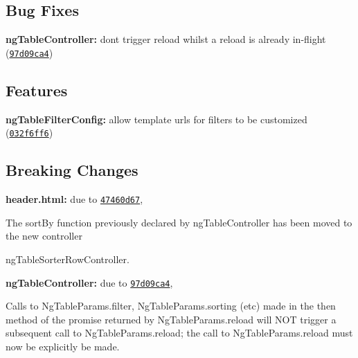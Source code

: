 \subsection*{Bug Fixes}


\begin{DoxyItemize}
\item {\bfseries ng\+Table\+Controller\+:} don\textquotesingle{}t trigger reload whilst a reload is already in-\/flight (\href{https://github.com/esvit/ng-table/commit/97d09ca43501ea97a30e1afcd04f6ed81df4f97d}{\tt 97d09ca4})
\end{DoxyItemize}

\subsection*{Features}


\begin{DoxyItemize}
\item {\bfseries ng\+Table\+Filter\+Config\+:} allow template urls for filters to be customized (\href{https://github.com/esvit/ng-table/commit/032f6ff6aec0fcad7c4d84976aee8dc317c67a6c}{\tt 032f6ff6})
\end{DoxyItemize}

\subsection*{Breaking Changes}


\begin{DoxyItemize}
\item {\bfseries header.\+html\+:} due to \href{https://github.com/esvit/ng-table/commit/47460d67acb518a402a42329e6108a4e86e436d6}{\tt 47460d67},
\end{DoxyItemize}

The sort\+By function previously declared by {\ttfamily ng\+Table\+Controller} has been moved to the new controller
\begin{DoxyItemize}
\item {\ttfamily ng\+Table\+Sorter\+Row\+Controller}.
\item {\bfseries ng\+Table\+Controller\+:} due to \href{https://github.com/esvit/ng-table/commit/97d09ca43501ea97a30e1afcd04f6ed81df4f97d}{\tt 97d09ca4},
\end{DoxyItemize}

Calls to {\ttfamily Ng\+Table\+Params.\+filter}, {\ttfamily Ng\+Table\+Params.\+sorting} (etc) made in the {\ttfamily then} method of the promise returned by {\ttfamily Ng\+Table\+Params.\+reload} will N\+OT trigger a subsequent call to {\ttfamily Ng\+Table\+Params.\+reload}; the call to {\ttfamily Ng\+Table\+Params.\+reload} must now be explicitly be made.


